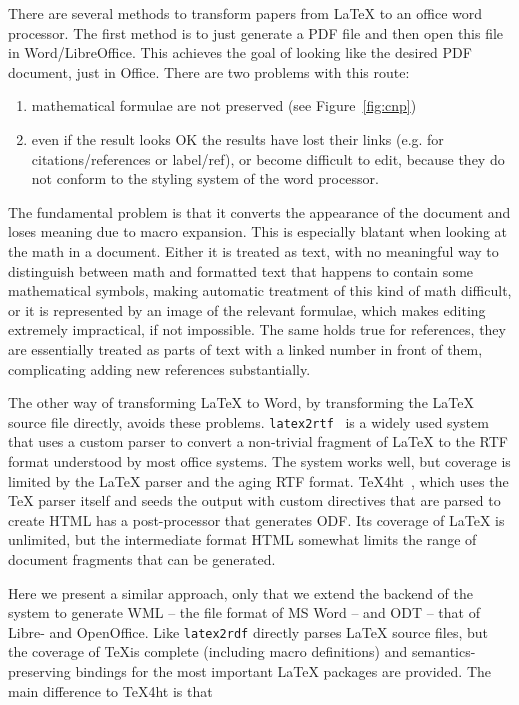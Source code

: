 \documentclass{article}
\begin{document}
There are several methods to transform papers from {\LaTeX} to an office word
processor. The first method is to just generate a PDF file and then open this file in
Word/LibreOffice. This achieves the goal of looking like the desired PDF document, just in
Office. There are two problems with this route: 
\begin{enumerate}
\item mathematical formulae are not preserved (see Figure~\ref{fig:cnp})
\item even if the result looks OK the results have lost their links (e.g. for
  citations/references or label/ref), or become difficult to edit, because they do not
  conform to the styling system of the word processor.
\end{enumerate}
The fundamental problem is that it converts the appearance of the document and loses
meaning due to macro expansion. This is especially blatant when looking at the math in a
document. Either it is treated as text, with no meaningful way to distinguish between math
and formatted text that happens to contain some mathematical symbols, making automatic
treatment of this kind of math difficult, or it is represented by an image of the relevant
formulae, which makes editing extremely impractical, if not impossible. The same holds true
for references, they are essentially treated as parts of text with a linked number in
front of them, complicating adding new references substantially.

The other way of transforming {\LaTeX} to Word, by transforming the {\LaTeX} source file
directly, avoids these problems. \texttt{latex2rtf}~\cite{latex2rtf:on} is a widely used
system that uses a custom parser to convert a non-trivial fragment of {\LaTeX} to the RTF
format understood by most office systems. The system works well, but coverage is limited
by the {\LaTeX} parser and the aging RTF format.  TeX4ht~\cite{tex4ht:online}, which uses
the {\TeX} parser itself and seeds the output with custom directives that are parsed to
create HTML has a post-processor that generates ODF. Its coverage of {\LaTeX} is unlimited,
but the intermediate format HTML somewhat limits the range of document fragments that can
be generated. 

Here we present a similar approach, only that we extend the backend of the  system
to generate WML -- the file format of MS Word -- and ODT -- that of Libre- and
OpenOffice. Like \texttt{latex2rdf}  directly parses {\LaTeX} source files, but
the coverage of \TeX is complete (including macro definitions) and semantics-preserving
bindings for the most important {\LaTeX} packages are provided. The main difference to
TeX4ht is that 
\end{document}
